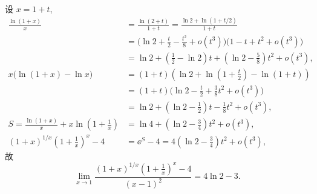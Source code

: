 \documentclass{amsart}
\begin{document}
设 $x=1+t$,
\begin{align*}
	\frac{\ln(1+x)}{x}&
	=\frac{\ln(2+t)}{1+t}
	=\frac{\ln 2+\ln(1+t/2)}{1+t}\\
	&=\bigl(\ln 2+\frac t2-\frac{t^2}8+o(t^3)\bigr)\bigl(1-t+t^2+o(t^3)\bigr)\\
	&=\ln2+(\frac12-\ln 2)t+(\ln 2-\frac 58)t^2+o(t^3),\\
	x\bigl(\ln(1+x)-\ln x\bigr)&
	=(1+t)(\ln 2+\ln(1+\frac t2)-\ln(1+t))\\
	&=(1+t)\bigl(\ln 2-\frac t2+\frac 38 t^2+o(t^3)\bigr)\\
	&=\ln 2+(\ln 2-\frac 12)t-\frac 18t^2+o(t^3),\\
	S=\frac{\ln(1+x)}{x}+x\ln(1+\frac 1x)
	&=\ln 4+(\ln 2-\frac 34)t^2+o(t^3),\\
	(1+x)^{1/x}(1+\frac1x)^x-4
	&=\ee^S-4
	=4(\ln 2-\frac 34)t^2+o(t^3),
\end{align*}
故
\[\lim_{x\to 1}\frac{(1+x)^{1/x}(1+\frac1x)^x-4}{(x-1)^2}=4\ln 2-3.
	\]
\end{document}
